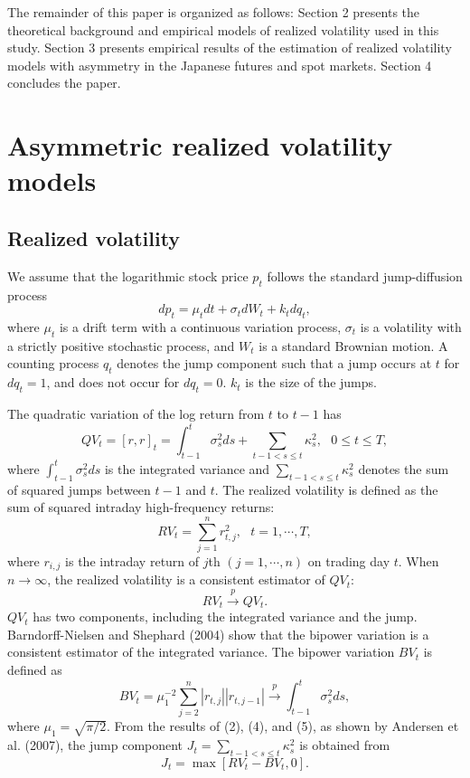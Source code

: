 \documentclass[10pt]{article}
\begin{document}
The remainder of this paper is organized as follows: 
Section 2 presents the theoretical background and empirical models of realized volatility used in this study. 
Section 3 presents empirical results of the estimation of realized volatility models with asymmetry in the Japanese futures and spot markets. 
Section 4 concludes the paper.


\section{Asymmetric realized volatility models}

\subsection{Realized volatility}
We assume that the logarithmic stock price $p_t$ follows the standard jump-diffusion process
\begin{equation}
dp_t=\mu_t dt+\sigma_t dW_t + k_t dq_t, 
\end{equation}
where $\mu_t$ is a drift term with a continuous variation process, $\sigma_t$ is a volatility with a strictly positive stochastic process, 
and $W_t$ is a standard Brownian motion. 
A counting process $q_t$ denotes the jump component such that a jump occurs at $t$ for $dq_t=1$, and does not occur for $dq_t=0$.  
$k_t$ is the size of the jumps. 

The quadratic variation of the log return from $t$ to $t-1$ has 
\begin{equation}
QV_t=[r,r]_t=\int_{t-1}^t \sigma_s^2 ds + \sum_{t-1<s \le t} \kappa_s^2, \ \ \ 0 \le t \le T, 
\end{equation}
where $\int_{t-1}^t \sigma_s^2 ds$ is the integrated variance and 
$\sum_{t-1<s \le t} \kappa_s^2$ denotes the sum of squared jumps between $t-1$ and $t$.
The realized volatility is defined as the sum of squared intraday high-frequency returns: 
\begin{equation}
RV_t=\sum_{j=1}^n r_{t,j}^2, \ \ \ t=1, \cdots, T,
\end{equation}
where $r_{i,j}$ is the intraday return of $j$th $(j=1,\cdots,n)$ on trading day $t$. 
When $n \rightarrow \infty$, the realized volatility is a consistent estimator of $QV_t$:
\begin{equation}
RV_t \stackrel{p}{\to} QV_t.
\end{equation}
$QV_t$ has two components, including the integrated variance and the jump. 
Barndorff-Nielsen and Shephard (2004) show that the bipower variation is a consistent estimator of the integrated variance. 
The bipower variation $BV_t$ is defined as
\begin{equation}
BV_t=\mu_1^{-2} \sum_{j=2}^n |r_{t,j}||r_{t,j-1}| \stackrel{p}{\to} \int_{t-1}^t \sigma_s^2 ds, 
\end{equation}
where $\mu_1=\sqrt{\pi/2}$. 
From the results of (2), (4), and (5), as shown by Andersen et al. (2007), the jump component $J_t= \sum_{t-1<s \le t} \kappa_s^2$ is obtained from 
\begin{equation}
J_t=\max [RV_t-BV_t,0]. 
\end{equation}
\end{document}
